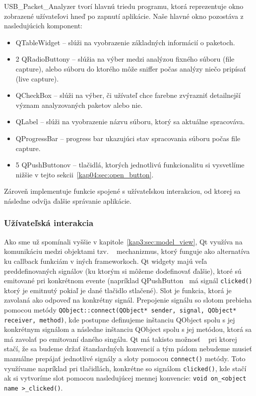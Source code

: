 USB\_Packet\_Analyzer tvorí hlavnú triedu programu, ktorá reprezentuje okno zobrazené užívateľovi hneď po zapnutí aplikácie. Naše hlavné okno pozostáva z nasledujúcich komponent:
\begin{itemize}
\item QTableWidget -- slúži na vyobrazenie základných informácií o paketoch.
\item 2 QRadioButtony -- slúžia na výber medzi analýzou fixného súboru (file capture), alebo súboru do ktorého môže sniffer počas analýzy niečo pripísať (live capture).
\item QCheckBox -- slúži na výber, či užívateľ chce farebne zvýrazniť detailnejší význam analyzovaných paketov alebo nie.
\item QLabel -- slúži na vyobrazenie názvu súboru, ktorý sa aktuálne spracováva.
\item QProgressBar -- progress bar ukazujúci stav spracovania súboru počas file capture.
\item 5 QPushButtonov -- tlačidlá, ktorých jednotlivú funkcionalitu si vysvetlíme nižšie v tejto sekcii~\ref{kap04:sec:open_button}.
\end{itemize}
Zároveň implementuje funkcie spojené s užívateľskou interakciou, od ktorej sa následne odvíja ďalšie správanie aplikácie.

\subsubsection{Užívateľská interakcia}
Ako sme už spomínali vyššie v kapitole~\ref{kap3:sec:model_view}, Qt využíva na komunikáciu medzi objektami tzv. ~\cite{signal_slot} mechanizmus, ktorý funguje ako alternatíva ku callback funkciám v iných frameworkoch. Qt widgety majú veľa preddefinovaných signálov (ku ktorým si môžeme dodefinovať ďalšie), ktoré sú emitované pri konkrétnom evente (napríklad QPushButton~\cite{qpushbutton} má signál \texttt{clicked()} ktorý je emitnutý pokiaľ je dané tlačidlo stlačené). Slot je funkcia, ktorá je zavolaná ako odpoveď na konkrétny signál. Prepojenie signálu so slotom prebieha pomocou metódy \texttt{QObject::connect(QObject* sender, signal, QObject* receiver, method)}, kde postupne definujeme inštanciu QObject spolu s jej konkrétnym signálom a následne inštanciu QObject spolu s jej metódou, ktorá sa má zavolať po emitovaní daného singálu. Qt má takisto možnosť ~\cite{qt_autoconnect} pri ktorej stačí, že sa budeme držať štandardných konvencií a tým pádom nebudeme musieť manuálne prepájať jednotlivé signály a sloty pomocou \texttt{connect()} metódy. Toto využívame napríklad pri tlačidlách, konkrétne so signálom \texttt{clicked()}, kde stačí ak si vytvoríme slot pomocou nasledujúcej mennej konvencie: \texttt{void on\_\textless object name \textgreater\_clicked()}.

